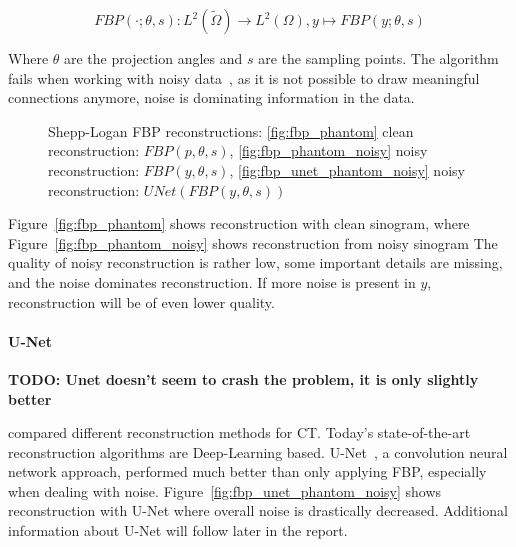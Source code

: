 \begin{equation}
    \label{eq:fbp}
    \textit{FBP}(\cdot; \theta, s) : L^2(\tilde{\Omega}) \to L^2(\Omega), y \mapsto \textit{FBP}(y; \theta, s)
\end{equation}

Where $\theta$ are the projection angles and $s$ are the sampling points.
The algorithm fails when working with noisy data~\cite{cryoEmMath2}, as it is not possible to draw meaningful connections anymore, noise
is dominating information in the data.

\begin{figure}[h]
    \label{fig:phantom_fbps}
    \hfill
    \hfill
    \hfill
    \hfill
	\caption{Shepp-Logan FBP reconstructions:
    \ref{fig:fbp_phantom} clean reconstruction: $\textit{FBP}(p, \theta, s)$,
    \ref{fig:fbp_phantom_noisy} noisy reconstruction: $\textit{FBP}(y, \theta, s)$,
    \ref{fig:fbp_unet_phantom_noisy} noisy reconstruction: $\textit{UNet}(\textit{FBP}(y, \theta, s))$ 
    }
\end{figure}

Figure~\ref{fig:fbp_phantom} shows reconstruction with clean sinogram, where Figure~\ref{fig:fbp_phantom_noisy} shows
reconstruction from noisy sinogram
The quality of noisy reconstruction is rather low, some important details are missing, and the noise dominates reconstruction.
If more noise is present in $y$, reconstruction will be of even lower quality.

\paragraph{U-Net}

\textbf{TODO:  Unet doesn't seem to crash the problem, it is only slightly better}

\citet{ct-reconstruction-comparison} compared different reconstruction methods for CT. 
Today's state-of-the-art reconstruction algorithms are Deep-Learning based.
U-Net~\cite{unet-tomography}, a convolution neural network approach, performed
much better than only applying FBP, especially when dealing with noise. Figure~\ref{fig:fbp_unet_phantom_noisy} 
shows reconstruction with U-Net where overall noise is drastically decreased.
Additional information about U-Net will follow later in the report.

